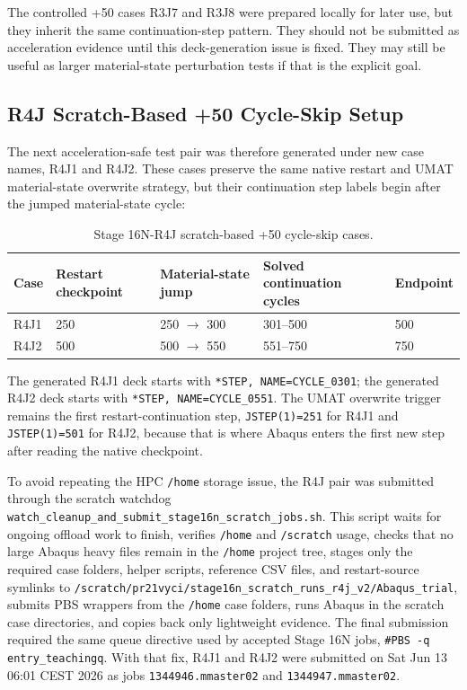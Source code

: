 \documentclass[11pt,a4paper]{article}
\newcommand{\code}[1]{\texttt{#1}}
\begin{document}
The controlled +50 cases R3J7 and R3J8 were prepared locally for later use, but they inherit the same continuation-step pattern. They should not be submitted as acceleration evidence until this deck-generation issue is fixed. They may still be useful as larger material-state perturbation tests if that is the explicit goal.

\subsection{R4J Scratch-Based +50 Cycle-Skip Setup}

The next acceleration-safe test pair was therefore generated under new case names, R4J1 and R4J2. These cases preserve the same native restart and UMAT material-state overwrite strategy, but their continuation step labels begin after the jumped material-state cycle:

\begin{table}[H]
\centering
\caption{Stage 16N-R4J scratch-based +50 cycle-skip cases.}
\begin{tabular}{lllll}
\toprule
Case & Restart checkpoint & Material-state jump & Solved continuation cycles & Endpoint \\
\midrule
R4J1 & 250 & 250 $\rightarrow$ 300 & 301--500 & 500 \\
R4J2 & 500 & 500 $\rightarrow$ 550 & 551--750 & 750 \\
\bottomrule
\end{tabular}
\end{table}

The generated R4J1 deck starts with \code{*STEP, NAME=CYCLE\_0301}; the generated R4J2 deck starts with \code{*STEP, NAME=CYCLE\_0551}. The UMAT overwrite trigger remains the first restart-continuation step, \code{JSTEP(1)=251} for R4J1 and \code{JSTEP(1)=501} for R4J2, because that is where Abaqus enters the first new step after reading the native checkpoint.

To avoid repeating the HPC \code{/home} storage issue, the R4J pair was submitted through the scratch watchdog \code{watch\_cleanup\_and\_submit\_stage16n\_scratch\_jobs.sh}. This script waits for ongoing offload work to finish, verifies \code{/home} and \code{/scratch} usage, checks that no large Abaqus heavy files remain in the \code{/home} project tree, stages only the required case folders, helper scripts, reference CSV files, and restart-source symlinks to \code{/scratch/pr21vyci/stage16n\_scratch\_runs\_r4j\_v2/Abaqus\_trial}, submits PBS wrappers from the \code{/home} case folders, runs Abaqus in the scratch case directories, and copies back only lightweight evidence. The final submission required the same queue directive used by accepted Stage 16N jobs, \code{\#PBS -q entry\_teachingq}. With that fix, R4J1 and R4J2 were submitted on Sat Jun 13 06:01 CEST 2026 as jobs \code{1344946.mmaster02} and \code{1344947.mmaster02}.
\end{document}
